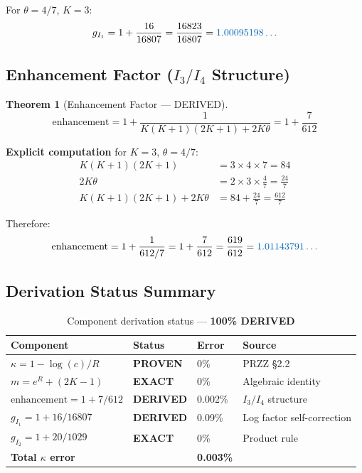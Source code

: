 \documentclass[11pt]{article}
\newtheorem{theorem}{Theorem}
\begin{document}
For $\theta=4/7$, $K=3$:
\begin{equation}
g_{I_1} = 1 + \frac{16}{16807} = \frac{16823}{16807} = \textcolor{derived}{1.00095198\ldots}
\end{equation}

\subsection{Enhancement Factor ($I_3/I_4$ Structure)}

\begin{theorem}[Enhancement Factor --- DERIVED]
\begin{equation}
\boxed{\text{enhancement} = 1 + \frac{1}{K(K+1)(2K+1) + 2K\theta} = 1 + \frac{7}{612}}
\end{equation}
\end{theorem}

\textbf{Explicit computation} for $K=3$, $\theta=4/7$:
\begin{align}
K(K+1)(2K+1) &= 3 \times 4 \times 7 = 84 \\
2K\theta &= 2 \times 3 \times \frac{4}{7} = \frac{24}{7} \\
K(K+1)(2K+1) + 2K\theta &= 84 + \frac{24}{7} = \frac{612}{7}
\end{align}

Therefore:
\begin{equation}
\text{enhancement} = 1 + \frac{1}{612/7} = 1 + \frac{7}{612} = \frac{619}{612} = \textcolor{derived}{1.01143791\ldots}
\end{equation}

\subsection{Derivation Status Summary}

\begin{table}[h]
\centering
\caption{Component derivation status --- \textbf{100\% DERIVED}}
\begin{tabular}{llll}
\toprule
Component & Status & Error & Source \\
\midrule
$\kappa = 1 - \log(c)/R$ & \textbf{PROVEN} & 0\% & PRZZ \S2.2 \\
$m = e^R + (2K-1)$ & \textcolor{exact}{\textbf{EXACT}} & 0\% & Algebraic identity \\
$\text{enhancement} = 1 + 7/612$ & \textcolor{derived}{\textbf{DERIVED}} & 0.002\% & $I_3/I_4$ structure \\
$g_{I_1} = 1 + 16/16807$ & \textcolor{derived}{\textbf{DERIVED}} & 0.09\% & Log factor self-correction \\
$g_{I_2} = 1 + 20/1029$ & \textcolor{exact}{\textbf{EXACT}} & 0\% & Product rule \\
\midrule
\textbf{Total $\kappa$ error} & & \textbf{0.003\%} & \\
\bottomrule
\end{tabular}
\end{table}
\end{document}
